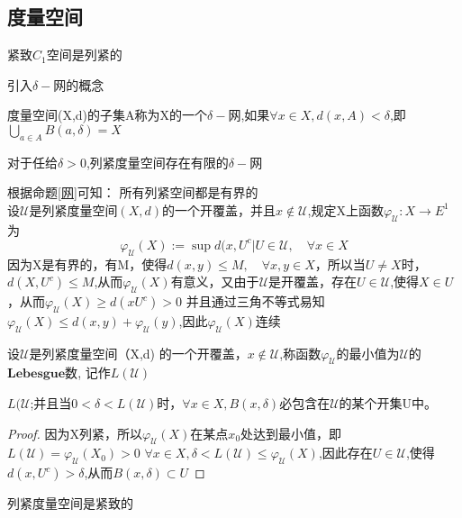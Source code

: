     \subsection*{度量空间}
    \begin{corollary}
        紧致\(C_1\)空间是列紧的
    \end{corollary}
    引入\(\delta-\text{网}\)的概念
    \begin{definition}
        度量空间(X,d)的子集A称为X的一个\(\delta-\text{网}\),如果\(\forall x \in X , d(x,A) < \delta\),即\(\bigcup_{a \in A }B (a,\delta) = X \)
    \end{definition}
   \begin{corollary}\label{网}
       对于任给\(\delta > 0\),列紧度量空间存在有限的\(\delta- \text{网}\)
   \end{corollary}
    根据命题\ref{网}可知： 所有列紧空间都是有界的\\
    设\(\mathscr{U}\)是列紧度量空间\((X,d)\)的一个开覆盖，并且\(x \notin \mathscr{U}\),规定X上函数\(\varphi_{\mathscr{U}}: X \rightarrow E^{1}\)为\[\varphi_{\mathscr{U}}(X) := \sup{ d(x,U^{c} | U \in \mathscr{U} } , \quad \forall x \in X \]
    因为X是有界的，有M，使得\(d(x,y) \leq M ,\quad \forall x ,y \in X \)，所以当\(U \neq X\)时，\(d(X,U^{c} ) \leq M \),从而\(\varphi_{\mathscr{U}}(X)\)有意义，又由于\(\mathscr{U}\)是开覆盖，存在\(U \in \mathscr{U}\),使得\(X \in U \)，从而\(\varphi_{\mathscr{U}}(X) \geq d(x U^{c}) > 0 \)
    并且通过三角不等式易知\(\varphi_{\mathscr{U}}(X) \leq d(x,y) + \varphi_{\mathscr{U}}(y)\),因此\(\varphi_{\mathscr{U}}(X)\)连续
    \begin{definition}
        设\(\mathscr{U}\)是列紧度量空间（X,d) 的一个开覆盖，\(x \notin \mathscr{U}\),称函数\(\varphi_{\mathscr{U}}\)的最小值为\(\mathscr{U}\)的\(\textbf{Lebesgue数}\), 记作\(L(\mathscr{U})\)
    \end{definition}
    \begin{corollary}
        \(L(\mathscr{U}\);并且当\( 0 < \delta < L(\mathscr{U})\)时，\(\forall x \in X , B(x,\delta)\)必包含在\(\mathscr{U}\)的某个开集U中。
    \end{corollary}
    \begin{proof}
        因为X列紧，所以\(\varphi_{\mathscr{U}}(X)\)在某点\(x_0\)处达到最小值，即\(L(\mathscr{U}) = \varphi_{\mathscr{U}}(X_0) > 0 \) \(\forall x \in X , \delta < L(\mathscr{U}) \leq \varphi_{\mathscr{U}}(X) \),因此存在\(U \in \mathscr{U} \),使得\(d(x,U^{c}) > \delta\),从而\(B(x,\delta) \subset U\)
    \end{proof}
    \begin{corollary}
        列紧度量空间是紧致的 
    \end{corollary}
